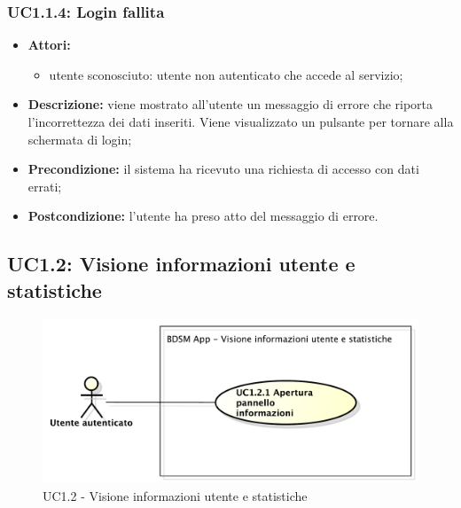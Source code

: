 \subsubsection{UC1.1.4: Login fallita}

\begin{itemize}
    \item \textbf{Attori:}
    \begin{itemize}
        \item utente sconosciuto: utente non autenticato che accede al servizio;
    \end{itemize}
    \item \textbf{Descrizione:} viene mostrato all'utente un messaggio di errore che riporta l'incorrettezza dei dati inseriti. Viene visualizzato un pulsante per tornare alla schermata di login;
    \item \textbf{Precondizione:} il sistema ha ricevuto una richiesta di accesso con dati errati;
    \item \textbf{Postcondizione:} l'utente ha preso atto del messaggio di errore.
\end{itemize}

\pagebreak

\subsection{UC1.2: Visione informazioni utente e statistiche}

\begin{figure}[htbp]
    \centering
    \centerline{\includegraphics[scale=0.6]{./images/UC1_2.pdf}}
    \caption{UC1.2 - Visione informazioni utente e statistiche}
\end{figure}

